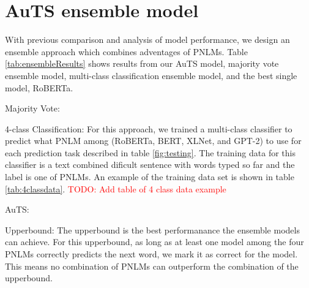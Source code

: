 \documentclass[11pt]{article}
\newcommand{\todo}[1]{\textcolor{red}{TODO: #1}}
\begin{document}
\section{AuTS ensemble model}

With previous comparison and analysis of model performance, we design an ensemble approach which combines adventages of PNLMs. Table \ref{tab:ensembleResults} shows results from our AuTS model, majority vote ensemble model, multi-class classification ensemble model, and the best single model, RoBERTa.

 Majority Vote:

 4-class Classification: For this approach, we trained a multi-class classifier to predict what PNLM among (RoBERTa, BERT, XLNet, and GPT-2) to use for each prediction task described in table \ref{fig:testing}. The training data for this classifier is a text combined dificult sentence with words typed so far and the label is one of PNLMs. An example of the training data set is shown in table \ref{tab:4classdata}. \todo{Add table of 4 class data example}


 AuTS: 

 Upperbound: The upperbound is the best performanance the ensemble models can achieve. For this upperbound, as long as at least one model among the four PNLMs correctly predicts the next word, we mark it as correct for the model. This means no combination of PNLMs can outperform the combination of the upperbound.
\end{document}
